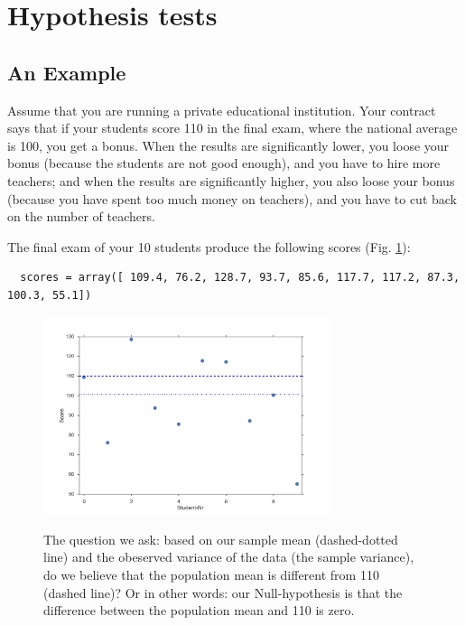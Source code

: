\section{Hypothesis tests}\label{sec:hypotheses} 

\subsection{An Example}

Assume that you are running a private educational institution. Your contract says that if your students score 110 in the final exam, where the national average is 100, you get a bonus. When the results are significantly lower, you loose your bonus (because the students are not good enough), and you have to hire more teachers; and when the results are significantly higher, you also loose your bonus (because you have spent too much money on teachers), and you have to cut back on the number of teachers.

The final exam of your 10 students produce the following scores (Fig. \ref{fig:ExampleTtest}):

\begin{lstlisting}
  scores = array([ 109.4, 76.2, 128.7, 93.7, 85.6, 117.7, 117.2, 87.3, 100.3, 55.1])
\end{lstlisting}

\begin{figure}[ht]
  \centering
  \includegraphics[width=0.75\textwidth]{../Images/fig_ExampleTtest.png}\\
  \caption{The question we ask: based on our sample mean (dashed-dotted line) and the obeserved variance of the data (the sample variance), do we believe that the population mean is different from 110 (dashed line)? Or in other words: our Null-hypothesis is that the difference between the population mean and 110 is zero.}\label{fig:ExampleTtest}
\end{figure}

